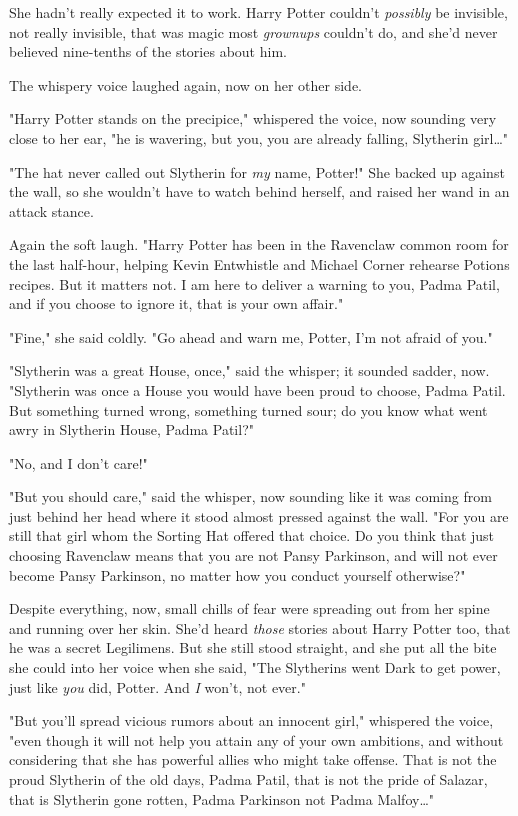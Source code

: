 She hadn't really expected it to work. Harry Potter couldn't \emph{possibly} be
invisible, not really invisible, that was magic most \emph{grownups} couldn't
do, and she'd never believed nine-tenths of the stories about him.

The whispery voice laughed again, now on her other side.

"Harry Potter stands on the precipice," whispered the voice, now sounding very
close to her ear, "he is wavering, but you, you are already falling, Slytherin
girl{\ldots}"

"The hat never called out Slytherin for \emph{my} name, Potter!" She backed up
against the wall, so she wouldn't have to watch behind herself, and raised her
wand in an attack stance.

Again the soft laugh. "Harry Potter has been in the Ravenclaw common room for
the last half-hour, helping Kevin Entwhistle and Michael Corner rehearse
Potions recipes. But it matters not. I am here to deliver a warning to you,
Padma Patil, and if you choose to ignore it, that is your own affair."

"Fine," she said coldly. "Go ahead and warn me, Potter, I'm not afraid of you."

"Slytherin was a great House, once," said the whisper; it sounded sadder, now.
"Slytherin was once a House you would have been proud to choose, Padma Patil.
But something turned wrong, something turned sour; do you know what went awry
in Slytherin House, Padma Patil?"

"No, and I don't care!"

"But you should care," said the whisper, now sounding like it was coming from
just behind her head where it stood almost pressed against the wall. "For you
are still that girl whom the Sorting Hat offered that choice. Do you think that
just choosing Ravenclaw means that you are not Pansy Parkinson, and will not
ever become Pansy Parkinson, no matter how you conduct yourself otherwise?"

Despite everything, now, small chills of fear were spreading out from her spine
and running over her skin. She'd heard \emph{those} stories about Harry Potter
too, that he was a secret Legilimens. But she still stood straight, and she put
all the bite she could into her voice when she said, "The Slytherins went Dark
to get power, just like \emph{you} did, Potter. And \emph{I} won't, not ever."

"But you'll spread vicious rumors about an innocent girl," whispered the voice,
"even though it will not help you attain any of your own ambitions, and without
considering that she has powerful allies who might take offense. That is not
the proud Slytherin of the old days, Padma Patil, that is not the pride of
Salazar, that is Slytherin gone rotten, Padma Parkinson not Padma
Malfoy{\ldots}"

